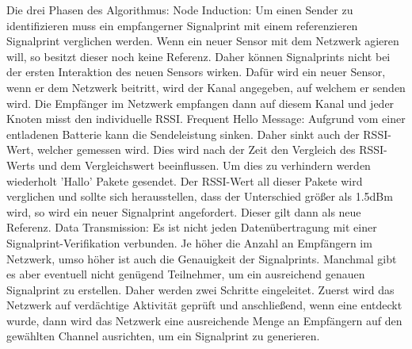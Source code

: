 \documentclass[12pt,a4paper]{article}
\begin{document}
Die drei Phasen des Algorithmus:
	Node Induction: 
		Um einen Sender zu identifizieren muss ein empfangerner Signalprint mit einem referenzieren Signalprint verglichen werden. Wenn ein neuer Sensor mit dem Netzwerk agieren will, so besitzt dieser noch keine Referenz.  Daher können Signalprints nicht bei der ersten Interaktion des neuen Sensors wirken. Dafür wird ein neuer Sensor, wenn er dem Netzwerk beitritt, wird der Kanal angegeben, auf welchem er senden wird. Die Empfänger im Netzwerk empfangen dann auf diesem Kanal und jeder Knoten misst den individuelle RSSI. 
	Frequent Hello Message:
		Aufgrund vom einer entladenen Batterie kann die Sendeleistung sinken. Daher sinkt auch der RSSI-Wert, welcher gemessen wird. Dies wird nach der Zeit den Vergleich des RSSI-Werts und dem Vergleichswert beeinflussen. Um dies zu verhindern werden wiederholt 'Hallo' Pakete gesendet. Der RSSI-Wert all dieser Pakete wird verglichen und sollte sich herausstellen, dass der Unterschied größer als 1.5dBm wird, so wird ein neuer Signalprint angefordert. Dieser gilt dann als neue Referenz.
	Data Transmission:
		Es ist nicht jeden Datenübertragung mit einer Signalprint-Verifikation verbunden. Je höher die Anzahl an Empfängern im Netzwerk, umso höher ist auch die Genauigkeit der Signalprints. Manchmal gibt es aber eventuell nicht genügend Teilnehmer, um ein ausreichend genauen Signalprint zu erstellen. Daher werden zwei Schritte eingeleitet. Zuerst wird das Netzwerk auf verdächtige Aktivität geprüft und anschließend, wenn eine entdeckt wurde, dann wird das Netzwerk eine ausreichende Menge an Empfängern auf den gewählten Channel ausrichten, um ein Signalprint zu generieren.
\end{document}
